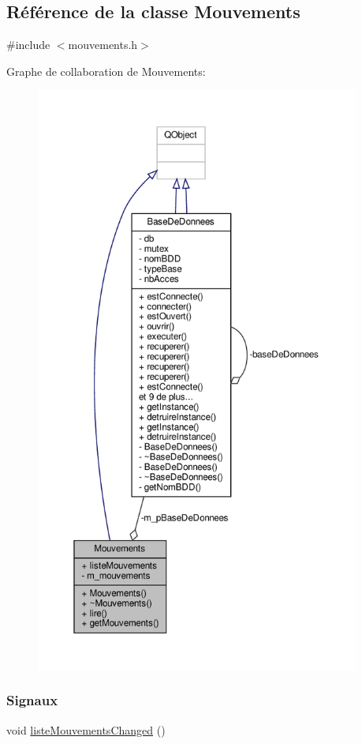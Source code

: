 \hypertarget{class_mouvements}{}\subsection{Référence de la classe Mouvements}
\label{class_mouvements}


{\ttfamily \#include $<$mouvements.\+h$>$}



Graphe de collaboration de Mouvements\+:\nopagebreak
\begin{figure}[H]
\begin{center}
\leavevmode
\includegraphics[height=550pt]{class_mouvements__coll__graph}
\end{center}
\end{figure}
\subsubsection*{Signaux}
\begin{DoxyCompactItemize}
\item 
void \hyperlink{class_mouvements_af7abb930cc252388d03b74b144b83084}{liste\+Mouvements\+Changed} ()
\end{DoxyCompactItemize}
